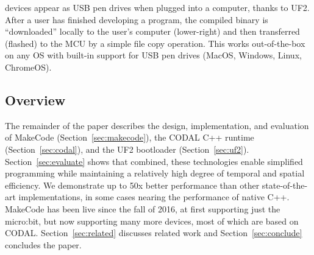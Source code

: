 \MC devices appear as USB pen drives when plugged into a computer, thanks to UF2. After a user has finished developing a program, the compiled binary is ``downloaded'' locally to the user's computer (lower-right) and then transferred (flashed) to the MCU by a simple file copy operation. This works out-of-the-box on any OS with built-in support for USB pen drives (MacOS, Windows, Linux, ChromeOS).

\subsection{Overview}

The remainder of the paper describes the design, implementation, and evaluation of MakeCode (Section~\ref{sec:makecode}), the CODAL C++ runtime (Section~\ref{sec:codal}), and the UF2 bootloader (Section~\ref{sec:uf2}). Section~\ref{sec:evaluate} shows that combined, these technologies enable simplified programming while maintaining a relatively high degree of temporal and spatial efficiency. We demonstrate up to 50x better performance than other state-of-the-art implementations, in some cases nearing the performance of native C++. MakeCode has been live since the fall of 2016, at first supporting just the micro:bit, but now supporting many more devices, most of which are based on CODAL. Section~\ref{sec:related} discusses related work and Section~\ref{sec:conclude} concludes the paper.









